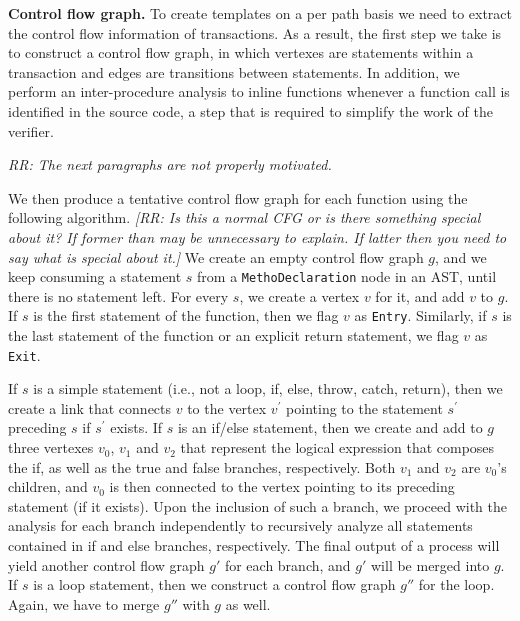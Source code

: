 
{\bf Control flow graph.} To create templates on a per path basis we need
to extract the control flow information of transactions. As a result, the first step
we take is to construct a control flow graph, in which vertexes are statements within
a transaction and edges are transitions between statements.
In addition, we perform an inter-procedure analysis to inline functions whenever a function call is identified in the source code, a step that is required to simplify the work of the verifier.

{\em RR: The next paragraphs are not properly motivated.}

We then produce a tentative control flow graph for each function using the following algorithm.
{\em [RR: Is this a normal CFG or is there something special about it? If former than may be unnecessary to
explain. If latter then you need to say what is special about it.]}
We create an empty control flow graph $g$, and we keep consuming a statement $s$ from a \texttt{MethoDeclaration} 
node in an AST, until there is no statement left. For every $s$, we create a vertex $v$
for it, and add $v$ to $g$. If $s$ is the first statement of the function, then
we flag $v$ as \texttt{Entry}. Similarly, if $s$ is the last statement of the function or an explicit return statement, we flag $v$ as \texttt{Exit}. 

If $s$ is a simple statement (i.e., not a loop, if, else, throw, catch, return), then we
create a link that connects $v$ to the vertex $v^{'}$ pointing to the statement $s^{'}$
preceding $s$ if $s^{'}$ exists. If $s$ is an if/else statement, then we create and add to $g$
three vertexes $v_0$, $v_1$ and $v_2$ that represent the logical expression that composes the if, as well as the true and false branches, respectively. 
Both $v_1$ and $v_2$ are $v_0$'s children, and $v_0$ is then connected to the vertex pointing
to its preceding statement (if it exists). Upon the inclusion of such a branch, we proceed with the analysis for each
branch independently to recursively analyze all 
statements contained in if and else branches, respectively. The final output of a process will
yield another control flow graph $g'$ for each branch, and $g'$ will be merged into $g$.
If $s$ is a loop statement, then we construct a control flow graph $g''$ for the loop. Again,
we have to merge $g''$ with $g$ as well.   

